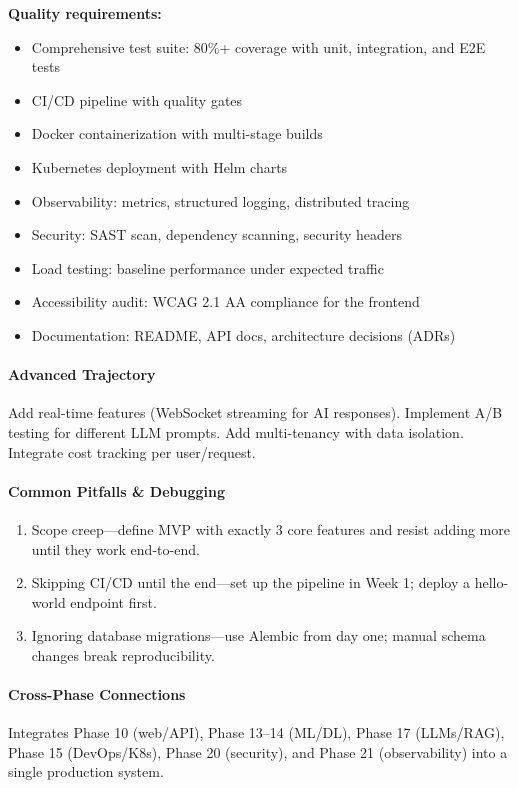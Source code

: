 \documentclass[11pt, a4paper, oneside]{report}
\begin{document}
\textbf{Quality requirements:}
\begin{itemize}[leftmargin=*]
\item Comprehensive test suite: 80\%+ coverage with unit, integration, and E2E tests
\item CI/CD pipeline with quality gates
\item Docker containerization with multi-stage builds
\item Kubernetes deployment with Helm charts
\item Observability: metrics, structured logging, distributed tracing
\item Security: SAST scan, dependency scanning, security headers
\item Load testing: baseline performance under expected traffic
\item Accessibility audit: WCAG 2.1 AA compliance for the frontend
\item Documentation: README, API docs, architecture decisions (ADRs)
\end{itemize}

\paragraph{Advanced Trajectory} Add real-time features (WebSocket streaming for AI responses). Implement A/B testing for different LLM prompts. Add multi-tenancy with data isolation. Integrate cost tracking per user/request.

\paragraph{Common Pitfalls \& Debugging}
\begin{enumerate}[leftmargin=*]
\item Scope creep---define MVP with exactly 3 core features and resist adding more until they work end-to-end.
\item Skipping CI/CD until the end---set up the pipeline in Week 1; deploy a hello-world endpoint first.
\item Ignoring database migrations---use Alembic from day one; manual schema changes break reproducibility.
\end{enumerate}

\paragraph{Cross-Phase Connections} Integrates Phase 10 (web/API), Phase 13--14 (ML/DL), Phase 17 (LLMs/RAG), Phase 15 (DevOps/K8s), Phase 20 (security), and Phase 21 (observability) into a single production system.
\end{document}
